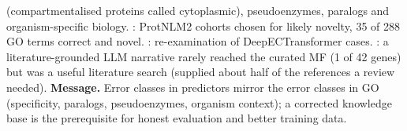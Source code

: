 (compartmentalised proteins called cytoplasmic), pseudoenzymes, paralogs and organism-specific biology.
: ProtNLM2 cohorts chosen for likely novelty, 35 of 288 GO terms correct
and novel. : re-examination of DeepECTransformer cases.
: a literature-grounded LLM narrative rarely reached the curated MF (1 of
42 genes) but was a useful literature search (supplied about half of the references a review needed).
\textbf{Message.} Error classes in predictors mirror the error classes in GO (specificity, paralogs,
pseudoenzymes, organism context); a corrected knowledge base is the prerequisite for honest evaluation
and better training data. 
